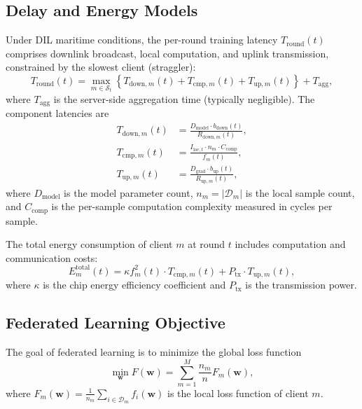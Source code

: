 \documentclass[journal]{IEEEtran}
\begin{document}
\subsection{Delay and Energy Models}
Under DIL maritime conditions, the per-round training latency $T_{\text{round}}(t)$ comprises downlink broadcast, local computation, and uplink transmission, constrained by the slowest client (straggler):
\begin{equation}
    T_{\text{round}}(t) = \max_{m \in \mathcal{S}_t} \left\{ T_{\text{down},m}(t) + T_{\text{cmp},m}(t) + T_{\text{up},m}(t) \right\} + T_{\text{agg}},
    \label{eq:t_round}
\end{equation}
where $T_{\text{agg}}$ is the server-side aggregation time (typically negligible). The component latencies are
\begin{align}
    T_{\text{down},m}(t) &= \frac{D_{\text{model}} \cdot b_{\text{down}}(t)}{R_{\text{down},m}(t)}, \label{eq:t_down} \\
    T_{\text{cmp},m}(t) &= \frac{I_{\text{loc},t} \cdot n_m \cdot C_{\text{comp}}}{f_m(t)}, \label{eq:t_cmp} \\
    T_{\text{up},m}(t) &= \frac{D_{\text{grad}} \cdot b_{\text{up}}(t)}{R_{\text{up},m}(t)}, \label{eq:t_up}
\end{align}
where $D_{\text{model}}$ is the model parameter count, $n_m = |\mathcal{D}_m|$ is the local sample count, and $C_{\text{comp}}$ is the per-sample computation complexity measured in cycles per sample.

The total energy consumption of client $m$ at round $t$ includes computation and communication costs:
\begin{equation}
    E^{\text{total}}_m(t) = \kappa f_m^2(t) \cdot T_{\text{cmp},m}(t) + P_{\text{tx}} \cdot T_{\text{up},m}(t),
    \label{eq:energy}
\end{equation}
where $\kappa$ is the chip energy efficiency coefficient and $P_{\text{tx}}$ is the transmission power.

\subsection{Federated Learning Objective}
The goal of federated learning is to minimize the global loss function
\begin{equation}
    \min_{\mathbf{w}} F(\mathbf{w}) = \sum_{m=1}^{M} \frac{n_m}{n} F_m(\mathbf{w}),
    \label{eq:fl_obj}
\end{equation}
where $F_m(\mathbf{w}) = \frac{1}{n_m} \sum_{i \in \mathcal{D}_m} f_i(\mathbf{w})$ is the local loss function of client $m$.
\end{document}
